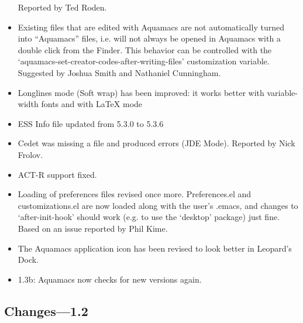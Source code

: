 \begin{itemize}
Reported by Ted Roden.
\item Existing files that are edited with Aquamacs are not automatically turned into ``Aquamacs'' files, i.e. will not always be opened in Aquamacs with a double click from the Finder. This behavior can be controlled with the `aquamacs-set-creator-codes-after-writing-files' customization variable. 
Suggested by Joshua Smith and Nathaniel Cunningham.
\item Longlines mode (Soft wrap) has been improved: it works better with variable-width fonts and with LaTeX mode
\item ESS Info file updated from 5.3.0 to 5.3.6
\item Cedet was missing a file and produced errors (JDE
  Mode). Reported by Nick Frolov.
\item ACT-R support fixed. 
\item Loading of preferences files revised once more.   Preferences.el and customizations.el are now loaded along   with the user's .emacs, and changes to `after-init-hook'   should work (e.g. to use the `desktop' package) just fine.   Based on an issue reported by Phil Kime.


\item The Aquamacs application icon has been revised to look better in Leopard's Dock.

\item 1.3b: Aquamacs now checks for new versions again. 

\end{itemize}

\subsection{Changes---1.2}


